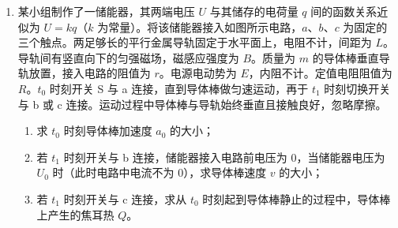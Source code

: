 \documentclass[\gkver]{gaokaozhenti}
\begin{document}
\begin{enumerate}
{解得 $\sin\theta = 0.9$
}
\item
某小组制作了一储能器，其两端电压 $U$ 与其储存的电荷量 $q$ 间的函数关系近似为 $U = kq$（$k$ 为常量）。将该储能器接入如图所示电路，$a$、$b$、$c$ 为固定的三个触点。两足够长的平行金属导轨固定于水平面上，电阻不计，间距为 $L$。导轨间有竖直向下的匀强磁场，磁感应强度为 $B$。质量为 $m$ 的导体棒垂直导轨放置，接入电路的阻值为 $r$。电源电动势为 $E$，内阻不计。定值电阻阻值为 $R$。$t_{0}$ 时刻开关 S 与 a 连接，直到导体棒做匀速运动，再于 $t_{1}$ 时刻切换开关与 b 或 c 连接。运动过程中导体棒与导轨始终垂直且接触良好，忽略摩擦。
\begin{enumerate}
	\item
	求 $t_{0}$ 时刻导体棒加速度 $a_{0}$ 的大小；
	\item
	若 $t_{1}$ 时刻开关与 b 连接，储能器接入电路前电压为 0，当储能器电压为 $U_{0}$ 时（此时电路中电流不为 0），求导体棒速度 $v$ 的大小；
	\item
	若 $t_{1}$ 时刻开关与 c 连接，求从 $t_{0}$ 时刻起到导体棒静止的过程中，导体棒上产生的焦耳热 $Q$。
\end{enumerate}
\onepicture[align=right, w=8.24cm]{}
\end{enumerate}
\end{document}
